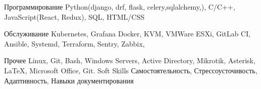 

\begin{cvskills}

  \cvskill
    {Программирование}
    {Python(django, drf, flask, celery,sqlalchemy,), C/C++, JavaScript(React, Redux), SQL, HTML/CSS} %

  \cvskill
    {Обслуживание}
    {Kubernetes, Grafana Docker, KVM, VMWare ESXi, GitLab CI, Ansible, Systemd, Terraform, Sentry, Zabbix, } %

  \cvskill
    {Прочее} %
    {Linux, Git, Bash, Windows Servers, Active Directory, Mikrotik, Asterisk, \LaTeX, Microsoft Office, Git.} %
  \cvskill
    {Soft Skills} %
    {Самостоятельность, Стрессоусточивость, Адаптивность, Навыки документирования } %

\end{cvskills}
